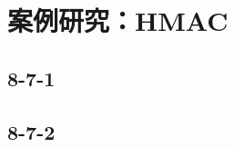 \section{案例研究：HMAC}\label{sec:8-7}

\subsection{8-7-1}\label{subsec:8-7-1}

\subsection{8-7-2}\label{subsec:8-7-2}